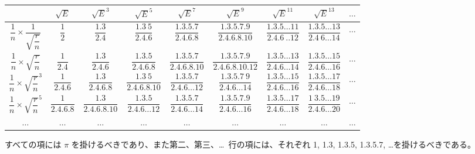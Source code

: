 \documentclass[11pt]{article}
\begin{document}
\begin{center}
\setlength{\tabcolsep}{3pt}
\renewcommand{\arraystretch}{1.6}
\begin{tabular}{|c||c|c|c|c|c|c|c|c|}
\hline
 & $\sqrt{E}$ & $\sqrt{E}^{3}$ & $\sqrt{E}^{5}$ & $\sqrt{E}^{7}$ & $\sqrt{E}^{9}$ & $\sqrt{E}^{11}$ & $\sqrt{E}^{13}$ & $\dots$ \\
\hline\hline
$\dfrac{1}{n}\times\dfrac{1}{\sqrt{\dfrac{r}{n}}}$ & $\dfrac{1}{2}$ & $\dfrac{1.3}{2.4}$ & $\dfrac{1.3\ 5}{2.4.6}$ & $\dfrac{1.3.5.7}{2.4.6.8}$ & $\dfrac{1.3.5.7.9}{2.4.6.8.10}$ & $\dfrac{1.3.5\dots 11}{2.4.6\ ..12}$ & $\dfrac{1.3.5\dots 13}{2.4\ 6\dots 14}$ & $\dots$ \\
\hline
$\dfrac{1}{n}\times\sqrt{\dfrac{r}{n}}$ & $\dfrac{1}{2.4}$ & $\dfrac{1.3}{2.4.6}$ & $\dfrac{1.3.5}{2.4.6.8}$ & $\dfrac{1.3.5.7}{2.4.6.8.10}$ & $\dfrac{1.3.5.7.9}{2.4.6.8.10.12}$ & $\dfrac{1.3.5\dots 13}{2.4.6\dots 14}$ & $\dfrac{1.3.5\dots 15}{2.4.6\dots 16}$ & $\dots$ \\
\hline
$\dfrac{1}{n}\times\sqrt{\dfrac{r}{n}}^{3}$ & $\dfrac{1}{2.4.6}$ & $\dfrac{1.3}{2.4.6.8}$ & $\dfrac{1.3\ 5}{2.4.6.8.10}$ & $\dfrac{1.3.5.7}{2.4.6\dots 12}$ & $\dfrac{1.3.5.7\ 9}{2.4.6\dots 14}$ & $\dfrac{1.3.5\dots 15}{2.4.6\dots 16}$ & $\dfrac{1.3.5\dots 17}{2.4.6\dots 18}$ & $\dots$ \\
\hline
$\dfrac{1}{n}\times\sqrt{\dfrac{r}{n}}^{5}$ & $\dfrac{1}{2.4.6.8}$ & $\dfrac{1.3}{2.4.6.8.10}$ & $\dfrac{1.3.5}{2.4.6\dots 12}$ & $\dfrac{1.3.5.7}{2.4.6\dots 14}$ & $\dfrac{1.3.5.7.9}{2.4.6\dots 16}$ & $\dfrac{1.3.5\dots 17}{2.4.6\dots 18}$ & $\dfrac{1\ 3.5\dots 19}{2.4.6\dots 20}$ & $\dots$ \\
\hline
$\dots$ & $\dots$ & $\dots$ & $\dots$ & $\dots$ & $\dots$ & $\dots$ & $\dots$ & $\dots$ \\
\hline
\end{tabular}
\end{center}

すべての項には $\pi$ を掛けるべきであり、また第二、第三、\dots\ 行の項には、それぞれ 1, 1.3, 1.3.5, 1.3.5.7, \dots を掛けるべきである。
\end{document}
